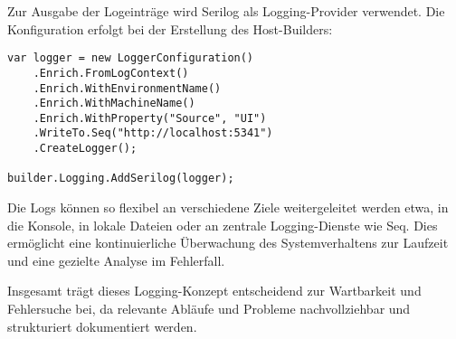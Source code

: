 Zur Ausgabe der Logeinträge wird Serilog als Logging-Provider verwendet.
Die Konfiguration erfolgt bei der Erstellung des Host-Builders:

\begin{lstlisting}
var logger = new LoggerConfiguration()
    .Enrich.FromLogContext()
    .Enrich.WithEnvironmentName()
    .Enrich.WithMachineName()
    .Enrich.WithProperty("Source", "UI")
    .WriteTo.Seq("http://localhost:5341")
    .CreateLogger();

builder.Logging.AddSerilog(logger);
\end{lstlisting}

Die Logs können so flexibel an verschiedene Ziele weitergeleitet werden etwa,
in die Konsole, in lokale Dateien oder an zentrale Logging-Dienste wie Seq.
Dies ermöglicht eine kontinuierliche Überwachung des Systemverhaltens zur
Laufzeit und eine gezielte Analyse im Fehlerfall.

Insgesamt trägt dieses Logging-Konzept entscheidend zur Wartbarkeit und Fehlersuche bei,
da relevante Abläufe und Probleme nachvollziehbar und strukturiert dokumentiert werden.

